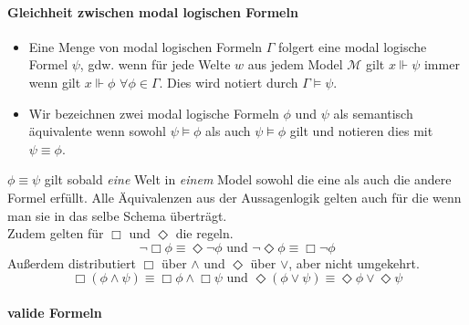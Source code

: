 \paragraph{Gleichheit zwischen modal logischen Formeln} %
\label{par:gleichheit}
%
\begin{definition}
	\label{def:model_folgert}
	\begin{itemize}
		\item Eine Menge von modal logischen Formeln $\Gamma$ folgert eine modal logische Formel $\psi$, gdw. wenn für jede Welte $w$ aus jedem Model $\mathcal{M}$ gilt $x \Vdash \psi$ immer wenn gilt $x \Vdash \phi$ $\forall \phi \in \Gamma$. 
		Dies wird notiert durch $\Gamma \vDash \psi$.
		\item Wir bezeichnen zwei modal logische Formeln $\phi$ und $\psi$ als semantisch äquivalente wenn sowohl $\psi \vDash \phi$ als auch $\psi \vDash \phi$ gilt und notieren dies mit $\psi \equiv \phi$.\\
		\cite[S.313]{huth2004logic}
	\end{itemize}	
\end{definition}
%
$\phi \equiv \psi$ gilt sobald \emph{eine} Welt in \emph{einem} Model sowohl die eine als auch die andere Formel erfüllt.
Alle Äquivalenzen aus der Aussagenlogik gelten auch für die \ML wenn man sie in das selbe Schema überträgt.\\
Zudem gelten für $\Box$ und $\Diamond$ die \deMorganRegeln regeln.\\
\begin{equation}
	\neg \Box \phi \equiv \Diamond \neg \phi \text{ und } \neg \Diamond \phi \equiv \Box \neg \phi
\end{equation}
%
Außerdem distributiert $\Box$ über $\wedge$ und $\Diamond$ über $\vee$, aber nicht umgekehrt. \cite[S.314]{huth2004logic}
\begin{equation}
	\Box(\phi \wedge \psi) \equiv \Box \phi \wedge \Box \psi \text{ und }
	\Diamond(\phi \vee \psi) \equiv \Diamond \phi \vee \Diamond \psi
\end{equation}



\paragraph{valide Formeln} %
\label{par:paragraph_name}

